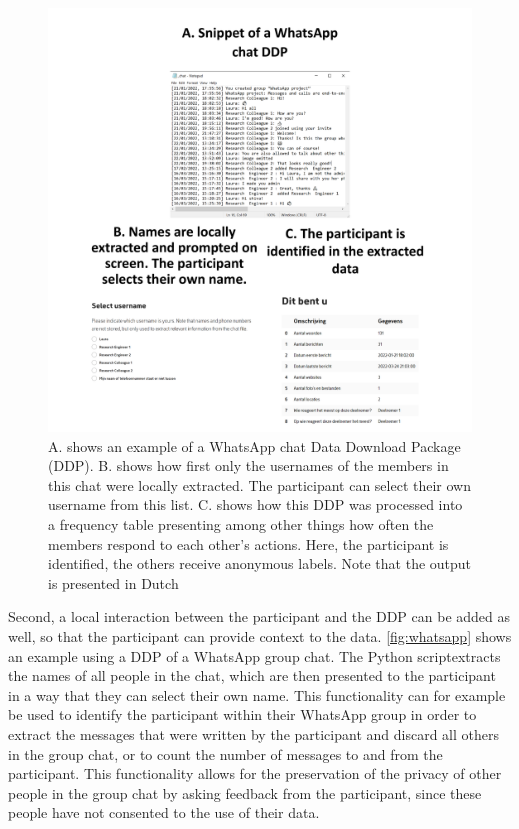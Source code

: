 \documentclass[
]{article}
\begin{document}
\begin{figure}
\centering
\includegraphics{WhatsApp_image.pdf}
\caption{A. shows an example of a WhatsApp chat Data Download Package
(DDP). B. shows how first only the usernames of the members in this chat
were locally extracted. The participant can select their own username
from this list. C. shows how this DDP was processed into a frequency
table presenting among other things how often the members respond to
each other's actions. Here, the participant is identified, the others
receive anonymous labels. Note that the output is presented in Dutch
\label{fig:whatsapp}}
\end{figure}

Second, a local interaction between the participant and the DDP can be
added as well, so that the participant can provide context to the data.
\autoref{fig:whatsapp} shows an example using a DDP of a WhatsApp group
chat. The Python scriptextracts the names of all people in the chat,
which are then presented to the participant in a way that they can
select their own name. This functionality can for example be used to
identify the participant within their WhatsApp group in order to extract
the messages that were written by the participant and discard all others
in the group chat, or to count the number of messages to and from the
participant. This functionality allows for the preservation of the
privacy of other people in the group chat by asking feedback from the
participant, since these people have not consented to the use of their
data.
\end{document}
